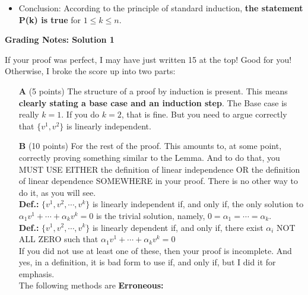 \documentclass[letterpaper]{article}
\begin{document}
\begin{enumerate}
\begin{itemize}
  \item Conclusion: According to the principle of standard induction, \textbf{the statement P(k) is true} for $1\le k \le n$.
\end{itemize}



\end{enumerate}


\vspace*{2cm}

\noindent \textbf{Grading Notes: Solution 1}

If your proof was perfect, I may have just written 15 at the top! Good for you! Otherwise, I broke the score up into two parts:\\

\begin{itemize}
\item[\bf A] (5 points) The structure of a proof by induction is present. This means \textbf{clearly stating a base case and an induction step}. The Base case is really $k=1$. If you do $k=2$, that is fine. But you need to argue correctly that $\{v^1, v^2\}$ is linearly independent.
\item[\bf B] (10 points) For the rest of the proof. This amounts to, at some point, correctly proving something similar to the Lemma. And to do that, you MUST USE EITHER the definition of linear independence OR the definition of linear dependence SOMEWHERE in your proof. There is no other way to do it, as you will see. \\

     \textbf{Def.:} $\{v^1, v^2, \cdots, v^{k}\}$ is linearly independent if, and only if, the only solution to $\alpha_1v^1 + \cdots + \alpha_k v^k=0$ is the trivial solution, namely, $0=\alpha_1=\cdots=\alpha_k$.\\

     \textbf{Def.:} $\{v^1, v^2, \cdots, v^{k}\}$ is linearly dependent if, and only if, there exist $\alpha_i$ NOT ALL ZERO such that $\alpha_1v^1 + \cdots + \alpha_k v^k=0$\\

     If you did not use at least one of these, then your proof is incomplete. And yes, in a definition, it is bad form to use if, and only if, but I did it for emphasis.\\



The following methods are \textbf{Erroneous:}
\begin{enumerate}


\end{enumerate}
\end{itemize}
\end{document}
